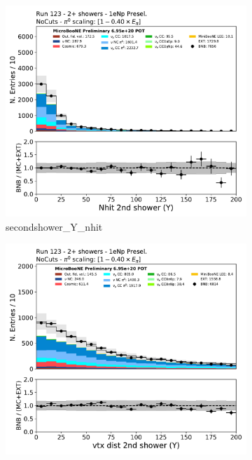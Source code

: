\begin{figure}[H]
    \centering
    \begin{subfigure}{0.3\textwidth}
    \includegraphics[width=1.0\textwidth]{Sidebands/Figures/1eNp/TwoShower/TwoPShr_NP_None_pi0e040/secondshower_Y_nhit.pdf}
    \caption{secondshower\_Y\_nhit}
    \end{subfigure}
    \begin{subfigure}{0.3\textwidth}
    \includegraphics[width=1.0\textwidth]{Sidebands/Figures/1eNp/TwoShower/TwoPShr_NP_None_pi0e040/secondshower_Y_vtxdist.pdf}

\end{subfigure}
\end{figure}
